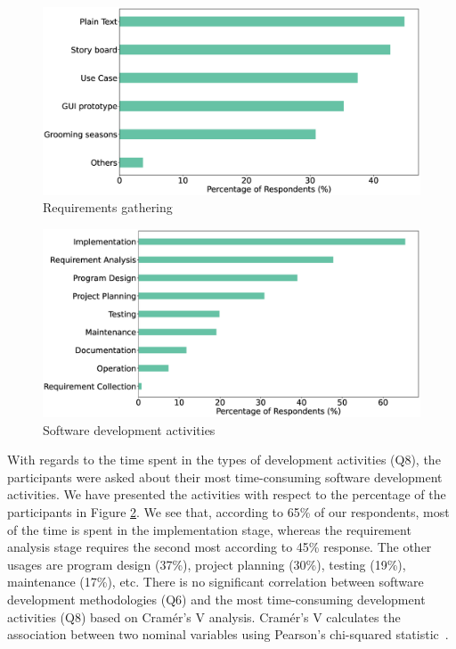 \begin{figure}[h]
\centering
  \includegraphics[scale=0.18]{Figures/Requirements_Gathering}
  \caption{Requirements gathering}
  \label{fig:requirements}
\end{figure}
\begin{figure}[h]
\centering
  \includegraphics[scale=0.2]{Figures/Respondents_Activities}
  \caption{Software development activities}
  \label{fig:activities}
\end{figure}

With regards to the time spent in the types of development activities (Q8), the
participants were asked about their most time-consuming software development
activities. We have presented the activities
with respect to the percentage of the participants in Figure
\ref{fig:activities}. We see that, according to 65\% of our respondents, most of
the time is spent in the implementation stage, whereas the requirement analysis
stage requires the second most according to 45\% response. The other usages are
program design (37\%), project planning (30\%), testing (19\%), maintenance
(17\%), etc. There is no significant correlation between software development
methodologies (Q6) and the most time-consuming development activities (Q8) based on Cram\'{e}r's V \cite{Cramer1946} analysis. Cram\'{e}r's V 
calculates the association between two nominal
variables using Pearson's chi-squared statistic~\cite{Sheskin2007}.


